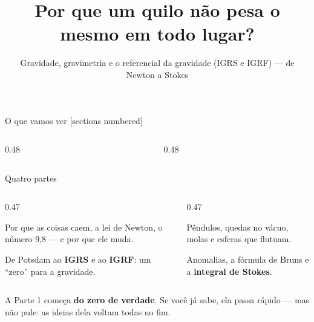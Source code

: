 \documentclass[aspectratio=169,11pt]{beamer}
\title{Por que um quilo não pesa o mesmo em todo lugar?}
\subtitle{Gravidade, gravimetria e o referencial da gravidade (IGRS e IGRF) --- de Newton a
Stokes}
\author{}
\institute{Simulador de Rede Gravimétrica}
\date{}
\newcommand{\bnum}[1]{\textbf{\textcolor{mTeal}{#1}}}
\begin{document}
\maketitle

\begin{frame}{O que vamos ver}
  [sections numbered]
  \footnotesize
  \begin{columns}[T]
    \begin{column}{0.48\textwidth}
      \tableofcontents[sections={1-8}]
    \end{column}
    \begin{column}{0.48\textwidth}
      \tableofcontents[sections={9-15}]
    \end{column}
  \end{columns}
\end{frame}

\begin{frame}{Quatro partes}
  \begin{columns}[T]
    \begin{column}{0.47\textwidth}
      \begin{regra}[title={Parte 1 · O que é a gravidade}]
        \small Por que as coisas caem, a lei de Newton, o número 9,8 --- e por que ele muda.
      \end{regra}
      \smallskip
      \begin{regra}[title={Parte 3 · O referencial}]
        \small De Potsdam ao \textbf{IGRS} e ao \textbf{IGRF}: um ``zero'' para a gravidade.
      \end{regra}
    \end{column}
    \begin{column}{0.47\textwidth}
      \begin{regra}[title={Parte 2 · Como se mede}]
        \small Pêndulos, quedas no vácuo, molas e esferas que flutuam.
      \end{regra}
      \smallskip
      \begin{regra}[title={Parte 4 · Da gravidade ao geoide}]
        \small Anomalias, a fórmula de Bruns e a \textbf{integral de Stokes}.
      \end{regra}
    \end{column}
  \end{columns}
  \bigskip
  \centering
  A Parte 1 começa \bnum{do zero de verdade}. Se você já sabe, ela passa rápido --- mas não
  pule: as ideias dela voltam todas no fim.
\end{frame}
\end{document}
